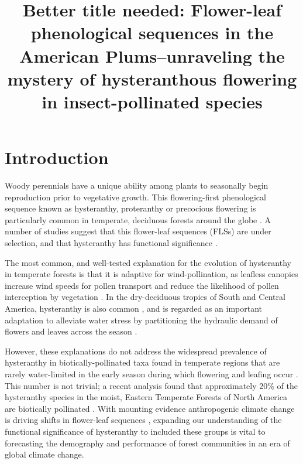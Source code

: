 \documentclass{article}[11pt]
\title{Better title needed: Flower-leaf phenological sequences in the American Plums--unraveling the mystery of hysteranthous flowering in insect-pollinated species}
\begin{document}

\maketitle


\section*{Introduction}
\noindent Woody perennials have a unique ability among plants to seasonally begin reproduction prior to vegetative growth. This flowering-first phenological sequence known as hysteranthy, proteranthy or precocious flowering is particularly common in temperate, deciduous forests around the globe \citep{Rathcke_1985}. A number of studies suggest that this flower-leaf sequences (FLSs) are under selection, and that hysteranthy has functional significance \citep{Gougherty2018,Buonaiuto2020,Guo2014}.

\noindent The most common, and well-tested explanation for the evolution of hysteranthy in temperate forests is that it is adaptive for wind-pollination, as leafless canopies increase wind speeds for pollen transport and reduce the likelihood of pollen interception by vegetation \citep{Whitehead1969,Niklas1985}. In the dry-deciduous tropics of South and Central America, hysteranthy is also common \citep{Rathcke_1985,Franklin2016}, and is regarded as an important adaptation to alleviate water stress by partitioning the hydraulic demand of flowers and leaves across the season \citep{Gougherty2018,Franklin2016,Borchert1983,Reich1984}.

However, these explanations do not address the widespread prevalence of hysteranthy in biotically-pollinated taxa found in temperate regions that are rarely water-limited in the early season during which flowering and leafing occur \citep{Polgar2011}. This number is not trivial; a recent analysis found that approximately 20\% of the hysteranthy species in the moist, Eastern Temperate Forests of North America are biotically pollinated \citep{Buonaiuto2020}. With mounting evidence anthropogenic climate change is driving shifts in flower-leaf sequences \citep{Ma2020:aa}, expanding our understanding of the functional significance of hysteranthy to included these groups is vital to forecasting the demography and performance of forest communities in an era of global climate change.
\end{document}
